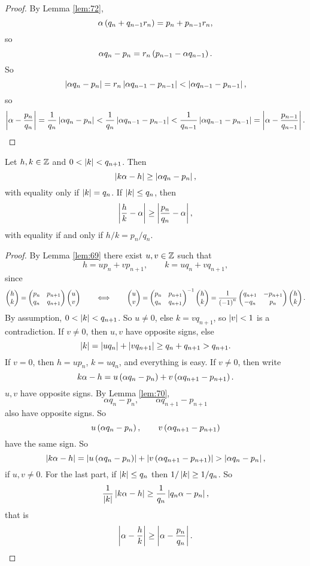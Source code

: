 \begin{proof}
By Lemma \ref{lem:72},
$$ \alpha\left( q_n + q_{n - 1}r_n \right) = p_n + p_{n - 1}r_n, $$
so
$$ \alpha q_n - p_n = r_n\left( p_{n - 1} - \alpha q_{n - 1} \right). $$
So
$$ \left\lvert \alpha q_n - p_n \right\rvert = r_n\left\lvert \alpha q_{n - 1} - p_{n - 1} \right\rvert < \left\lvert \alpha q_{n - 1} - p_{n - 1} \right\rvert, $$
so
$$ \left\lvert \alpha - \dfrac{p_n}{q_n} \right\rvert = \dfrac{1}{q_n}\left\lvert \alpha q_n - p_n \right\rvert < \dfrac{1}{q_n}\left\lvert \alpha q_{n - 1} - p_{n - 1} \right\rvert < \dfrac{1}{q_{n - 1}}\left\lvert \alpha q_{n - 1} - p_{n - 1} \right\rvert = \left\lvert \alpha - \dfrac{p_{n - 1}}{q_{n - 1}} \right\rvert. $$
\end{proof}

\begin{theorem}
\label{thm:74}
Let $ h, k \in \mathbb{Z} $ and $ 0 < \left\lvert k \right\rvert < q_{n + 1} $. Then
$$ \left\lvert k\alpha - h \right\rvert \ge \left\lvert \alpha q_n - p_n \right\rvert, $$
with equality only if $ \left\lvert k \right\rvert = q_n $. If $ \left\lvert k \right\rvert \le q_n $, then
$$ \left\lvert \dfrac{h}{k} - \alpha \right\rvert \ge \left\lvert \dfrac{p_n}{q_n} - \alpha \right\rvert, $$
with equality if and only if $ h / k = p_n / q_n $.
\end{theorem}

\begin{proof}
By Lemma \ref{lem:69} there exist $ u, v \in \mathbb{Z} $ such that
$$ h = up_n + vp_{n + 1}, \qquad k = uq_n + vq_{n + 1}, $$
since
$$ \begin{pmatrix} h \\ k \end{pmatrix} = \begin{pmatrix} p_n & p_{n + 1} \\ q_n & q_{n + 1} \end{pmatrix}\begin{pmatrix} u \\ v \end{pmatrix} \qquad \iff \qquad \begin{pmatrix} u \\ v \end{pmatrix} = \begin{pmatrix} p_n & p_{n + 1} \\ q_n & q_{n + 1} \end{pmatrix}^{-1}\begin{pmatrix} h \\ k \end{pmatrix} = \dfrac{1}{\left( -1 \right)^n}\begin{pmatrix} q_{n + 1} & -p_{n + 1} \\ -q_n & p_n \end{pmatrix}\begin{pmatrix} h \\ k \end{pmatrix}. $$
By assumption, $ 0 < \left\lvert k \right\rvert < q_{n + 1} $. So $ u \ne 0 $, else $ k = vq_{n + 1} $, so $ \left\lvert v \right\rvert < 1 $ is a contradiction. If $ v \ne 0 $, then $ u, v $ have opposite signs, else
$$ \left\lvert k \right\rvert = \left\lvert uq_n \right\rvert + \left\lvert vq_{n + 1} \right\rvert \ge q_n + q_{n + 1} > q_{n + 1}. $$
If $ v = 0 $, then $ h = up_n $, $ k = uq_n $, and everything is easy. If $ v \ne 0 $, then write
$$ k\alpha - h = u\left( \alpha q_n - p_n \right) + v\left( \alpha q_{n + 1} - p_{n + 1} \right). $$
$ u, v $ have opposite signs. By Lemma \ref{lem:70},
$$ \alpha q_n - p_n, \qquad \alpha q_{n + 1} - p_{n + 1} $$
also have opposite signs. So
$$ u\left( \alpha q_n - p_n \right), \qquad v\left( \alpha q_{n + 1} - p_{n + 1} \right) $$
have the same sign. So
$$ \left\lvert k\alpha - h \right\rvert = \left\lvert u\left( \alpha q_n - p_n \right) \right\rvert + \left\lvert v\left( \alpha q_{n + 1} - p_{n + 1} \right) \right\rvert > \left\lvert \alpha q_n - p_n \right\rvert, $$
if $ u, v \ne 0 $. For the last part, if $ \left\lvert k \right\rvert \le q_n $ then $ 1 / \left\lvert k \right\rvert \ge 1 / q_n $. So
$$ \dfrac{1}{\left\lvert k \right\rvert}\left\lvert k\alpha - h \right\rvert \ge \dfrac{1}{q_n}\left\lvert q_n\alpha - p_n \right\rvert, $$
that is
$$ \left\lvert \alpha - \dfrac{h}{k} \right\rvert \ge \left\lvert \alpha - \dfrac{p_n}{q_n} \right\rvert. $$
\end{proof}

